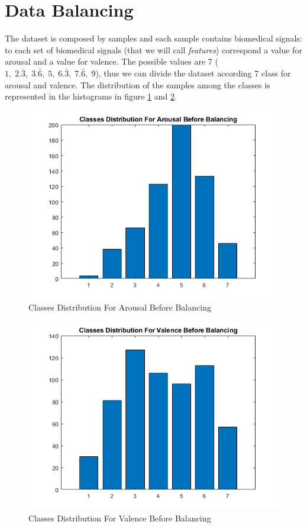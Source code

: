 \documentclass[a4paper]{report}
\begin{document}
	\section{Data Balancing}
	\noindent The dataset is composed by samples and each sample contains biomedical signals: to each set of biomedical signals (that we will call \textit{features}) correspond a value for arousal and a value for valence. The possible values are 7 ($1,\; 2.\bar3,\; 3.\bar6,\; 5,\; 6.\bar3,\; 7.\bar6,\; 9$), thus we can divide the dataset according 7 class for arousal and valence. The distribution of the samples among the classes is represented in the histograms in figure \ref{beforeBalancingArousal} and \ref{beforeBalancingValence}.
	
	\begin{figure}[htpb]
		\centering
		\includegraphics[scale=0.7]{img/beforeBalancingArousal.png}
		\caption{Classes Distribution For Arousal Before Balancing}
		\label{beforeBalancingArousal}
	\end{figure}  

	\begin{figure}[htpb]
		\centering
		\includegraphics[scale=0.7]{img/beforeBalancingValence.png}
		\caption{Classes Distribution For Valence Before Balancing}
		\label{beforeBalancingValence}
	\end{figure}
\end{document}
